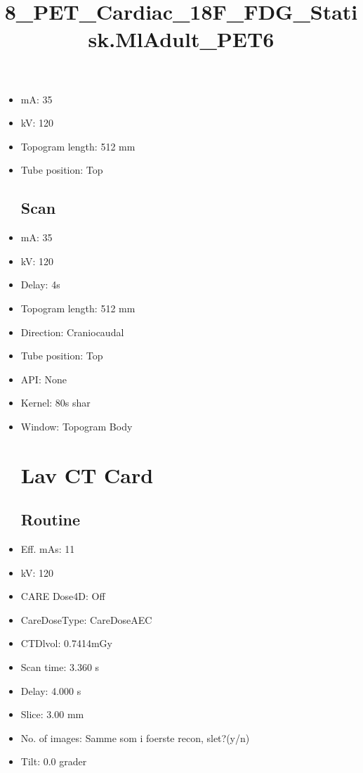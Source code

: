 \documentclass[12pt]{article}
\title{8\_PET\_Cardiac\_18F\_FDG\_Statisk.MlAdult\_PET6}
\begin{document}
\maketitle
\newpage
\tableofcontents
\newpage
{}


\begin{itemize}[noitemsep]\section{Topogram}
\subsection{Routine}
\item mA: 35\item kV: 120\item Topogram length: 512 mm\item Tube position: Top
\subsection{Scan}\item mA: 35\item kV: 120\item Delay: 4s\item Topogram length: 512 mm\item Direction: Craniocaudal\item Tube position: Top\item API: None\item Kernel: 80s shar\item Window: Topogram Body
\section{Lav CT Card}
\subsection{Routine}
\item Eff. mAs: 11\item kV: 120\item CARE Dose4D: Off\item CareDoseType: CareDoseAEC\item CTDlvol: 0.7414mGy\item Scan time: 3.360 s\item Delay: 4.000 s\item Slice: 3.00 mm\item No. of images: Samme som i foerste recon, slet?(y/n)\item Tilt: 0.0 grader

\end{itemize}
\end{document}
